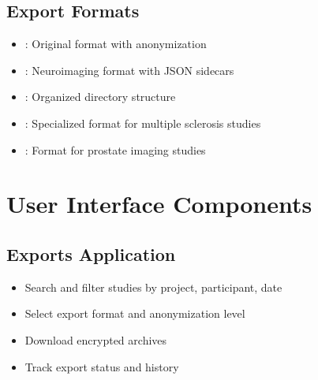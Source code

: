 \documentclass[letterpaper,10pt,english]{sphinxmanual}
\begin{document}
\subsection{Export Formats}
\label{\detokenize{Temp/end-user-options:export-formats}}\begin{itemize}
\item {} 
\sphinxAtStartPar
{}: Original format with anonymization

\item {} 
\sphinxAtStartPar
{}: Neuroimaging format with JSON sidecars

\item {} 
\sphinxAtStartPar
{}: Organized directory structure

\item {} 
\sphinxAtStartPar
{}: Specialized format for multiple sclerosis studies

\item {} 
\sphinxAtStartPar
{}: Format for prostate imaging studies

\end{itemize}


\section{User Interface Components}
\label{\detokenize{Temp/end-user-options:user-interface-components}}

\subsection{Exports Application}
\label{\detokenize{Temp/end-user-options:exports-application}}\begin{itemize}
\item {} 
\sphinxAtStartPar
Search and filter studies by project, participant, date

\item {} 
\sphinxAtStartPar
Select export format and anonymization level

\item {} 
\sphinxAtStartPar
Download encrypted archives

\item {} 
\sphinxAtStartPar
Track export status and history

\end{itemize}
\end{document}
